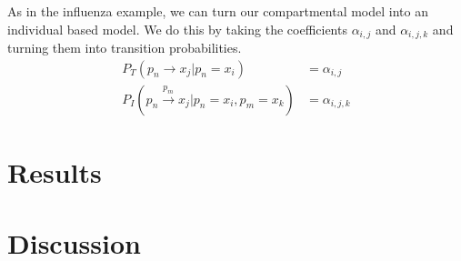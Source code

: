 \documentclass{article}
\begin{document}
As in the influenza example, we can turn our compartmental model into an individual based model.  We do this by taking the coefficients $\alpha_{i,j}$ and $\alpha_{i,j,k}$ and turning them into transition probabilities.
\begin{align*}
   P_T(p_n \rightarrow x_j \vert p_n = x_i ) &= \alpha_{i,j}
\\ P_I(p_n \xrightarrow{p_m} x_j  \vert p_n = x_i, p_m = x_k) &= \alpha_{i,j,k}
\end{align*}



\section{Results}
\section{Discussion}

{}

\end{document}
